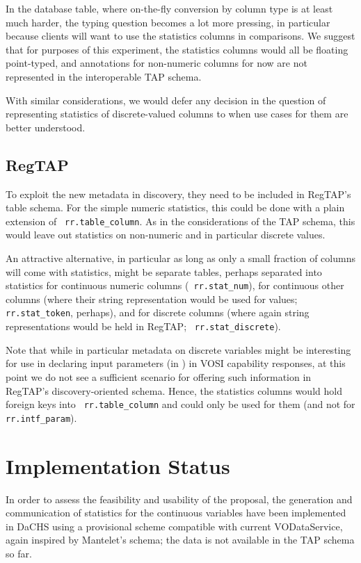 \documentclass[11pt,a4paper]{ivoa}
\newcommand{\rtent}[1]{\texttt{\color{rtcolor} #1}}
\begin{document}
In the database table, where on-the-fly conversion by column type is at
least much harder, the typing question becomes a lot more pressing, in
particular because clients will want to use the statistics columns in
comparisons.  We
suggest that for purposes of this experiment, the statistics columns
would all be floating point-typed, and annotations for non-numeric
columns for now are not represented in the interoperable TAP schema.

With similar considerations, we would defer any decision in the question
of representing statistics of discrete-valued columns to when use cases
for them are better understood.

\subsection{RegTAP}

To exploit the new metadata in discovery, they need to be included in
RegTAP's table schema.  For the simple numeric statistics, this could be
done with a plain extension of \rtent{rr.table\_column}.  As in the
considerations of the TAP schema, this would leave out statistics on
non-numeric and in particular discrete values.

An attractive alternative, in particular as long as only a small
fraction of columns will come with statistics, might be separate tables,
perhaps separated into statistics for continuous numeric columns
(\rtent{rr.stat\_num}), for continuous other columns (where their string
representation would be used for values; \rtent{rr.stat\_token},
perhaps), and for discrete columns (where again string representations
would be held in RegTAP; \rtent{rr.stat\_discrete}).

Note that while in particular metadata on discrete variables might be
interesting for use in declaring input parameters (in
) in VOSI capability responses, at this point we do
not see a sufficient scenario for offering such information in RegTAP's
discovery-oriented schema.  Hence, the statistics columns would hold
foreign keys into \rtent{rr.table\_column} and could only be used for
them (and not for \rtent{rr.intf\_param}).


\section{Implementation Status}

In order to assess the feasibility and usability of the proposal, the
generation and communication of statistics for the continuous variables
have been implemented in DaCHS using a provisional scheme compatible
with current VODataService, again inspired by Mantelet's schema; the
data is not available in the TAP schema so far.
\end{document}
